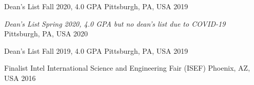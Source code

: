 






\begin{cvhonors}

\cvhonor
{Dean's List} %
{Fall 2020, 4.0 GPA} %
{Pittsburgh, PA, USA} %
{2019} %

\cvhonor
{\emph{Dean's List}} %
{\emph{Spring 2020, 4.0 GPA but no dean's list due to COVID-19} } %
{Pittsburgh, PA, USA} %
{2020} %

\cvhonor
{Dean's List} %
{Fall 2019, 4.0 GPA} %
{Pittsburgh, PA, USA} %
{2019} %

\end{cvhonors}




\begin{cvhonors}

\cvhonor
{Finalist} %
{Intel International Science and Engineering Fair (ISEF)} %
{Phoenix, AZ, USA} %
{2016} %


\end{cvhonors}


